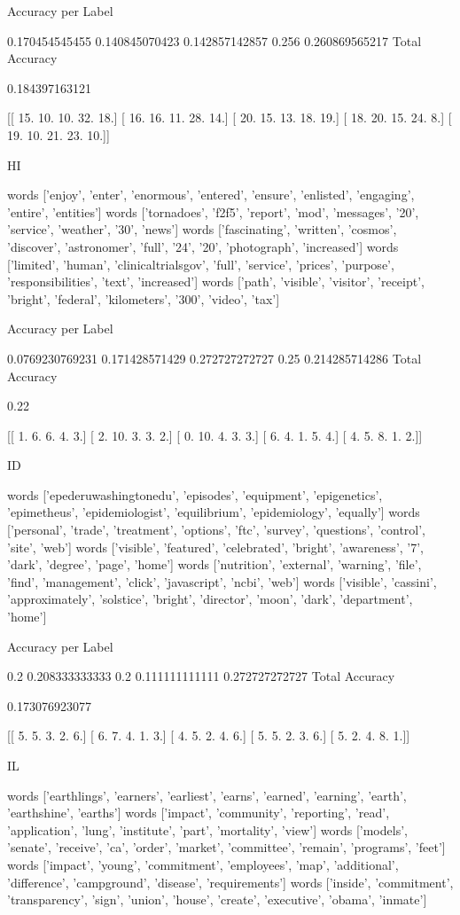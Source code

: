 \documentclass[11pt]{article}
\begin{document}
\begin{verbatium}
Accuracy per Label

0.170454545455
0.140845070423
0.142857142857
0.256
0.260869565217
Total Accuracy

0.184397163121


[[ 15.  10.  10.  32.  18.]
 [ 16.  16.  11.  28.  14.]
 [ 20.  15.  13.  18.  19.]
 [ 18.  20.  15.  24.   8.]
 [ 19.  10.  21.  23.  10.]]


HI


words
['enjoy', 'enter', 'enormous', 'entered', 'ensure', 'enlisted', 'engaging', 'entire', 'entities']
words
['tornadoes', 'f2f5', 'report', 'mod', 'messages', '20', 'service', 'weather', '30', 'news']
words
['fascinating', 'written', 'cosmos', 'discover', 'astronomer', 'full', '24', '20', 'photograph', 'increased']
words
['limited', 'human', 'clinicaltrialsgov', 'full', 'service', 'prices', 'purpose', 'responsibilities', 'text', 'increased']
words
['path', 'visible', 'visitor', 'receipt', 'bright', 'federal', 'kilometers', '300', 'video', 'tax']

Accuracy per Label

0.0769230769231
0.171428571429
0.272727272727
0.25
0.214285714286
Total Accuracy

0.22


[[  1.   6.   6.   4.   3.]
 [  2.  10.   3.   3.   2.]
 [  0.  10.   4.   3.   3.]
 [  6.   4.   1.   5.   4.]
 [  4.   5.   8.   1.   2.]]


ID


words
['epederuwashingtonedu', 'episodes', 'equipment', 'epigenetics', 'epimetheus', 'epidemiologist', 'equilibrium', 'epidemiology', 'equally']
words
['personal', 'trade', 'treatment', 'options', 'ftc', 'survey', 'questions', 'control', 'site', 'web']
words
['visible', 'featured', 'celebrated', 'bright', 'awareness', '7', 'dark', 'degree', 'page', 'home']
words
['nutrition', 'external', 'warning', 'file', 'find', 'management', 'click', 'javascript', 'ncbi', 'web']
words
['visible', 'cassini', 'approximately', 'solstice', 'bright', 'director', 'moon', 'dark', 'department', 'home']

Accuracy per Label

0.2
0.208333333333
0.2
0.111111111111
0.272727272727
Total Accuracy

0.173076923077


[[ 5.  5.  3.  2.  6.]
 [ 6.  7.  4.  1.  3.]
 [ 4.  5.  2.  4.  6.]
 [ 5.  5.  2.  3.  6.]
 [ 5.  2.  4.  8.  1.]]


IL


words
['earthlings', 'earners', 'earliest', 'earns', 'earned', 'earning', 'earth', 'earthshine', 'earths']
words
['impact', 'community', 'reporting', 'read', 'application', 'lung', 'institute', 'part', 'mortality', 'view']
words
['models', 'senate', 'receive', 'ca', 'order', 'market', 'committee', 'remain', 'programs', 'feet']
words
['impact', 'young', 'commitment', 'employees', 'map', 'additional', 'difference', 'campground', 'disease', 'requirements']
words
['inside', 'commitment', 'transparency', 'sign', 'union', 'house', 'create', 'executive', 'obama', 'inmate']


\end{verbatium}
\end{document}

